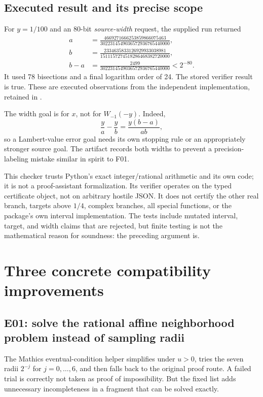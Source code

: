 \documentclass[11pt,letterpaper]{article}
\begin{document}
\subsection{Executed result and its precise scope}

For $y=1/100$ and an 80-bit \emph{source-width} request, the supplied run returned
\begin{align*}
 a&=\frac{4669271666253859866075463}
          {3022314549036572936765440000},\\
 b&=\frac{2334635833126929933038981}
          {1511157274518286468382720000},\\
 b-a&=\frac{2499}{3022314549036572936765440000}
       <2^{-80}.
\end{align*}
It used 78 bisections and a final logarithm order of 24. The stored verifier result is true. These are executed observations from the independent implementation, retained in .

The width goal is for $x$, not for $W_{-1}(-y)$. Indeed,
\[
 \frac{y}{a}-\frac{y}{b}=\frac{y(b-a)}{ab},
\]
so a Lambert-value error goal needs its own stopping rule or an appropriately stronger source goal. The artifact records both widths to prevent a precision-labeling mistake similar in spirit to F01.

This checker trusts Python's exact integer/rational arithmetic and its own code; it is not a proof-assistant formalization. Its verifier operates on the typed certificate object, not on arbitrary hostile JSON. It does not certify the other real branch, targets above $1/4$, complex branches, all special functions, or the package's own interval implementation. The tests include mutated interval, target, and width claims that are rejected, but finite testing is not the mathematical reason for soundness: the preceding argument is.

\section{Three concrete compatibility improvements}\label{sec:extensions}
\subsection{E01: solve the rational affine neighborhood problem instead of sampling radii}

The Mathics eventual-condition helper simplifies under $u>0$, tries the seven radii $2^{-j}$ for $j=0,\ldots,6$, and then falls back to the original proof route. A failed trial is correctly not taken as proof of impossibility. But the fixed list adds unnecessary incompleteness in a fragment that can be solved exactly.\cite{mathics-branches}
\end{document}
